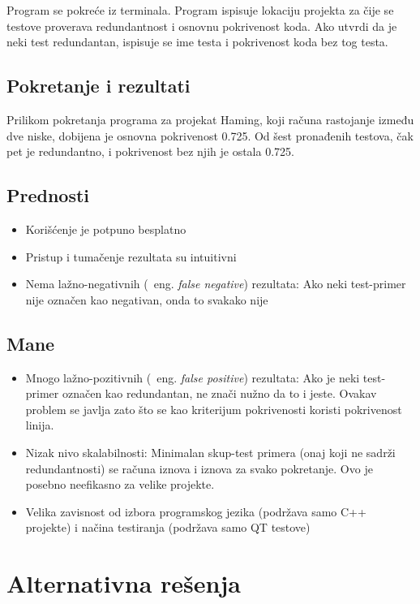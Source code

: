\documentclass[a4paper]{article}
\begin{document}
Program se pokreće iz terminala. Program ispisuje lokaciju projekta za čije se testove proverava redundantnost i osnovnu pokrivenost koda. Ako utvrdi da je neki test redundantan, ispisuje se ime testa i pokrivenost koda bez tog testa.

\subsection{Pokretanje i rezultati}
\label{subsec:pokretanje_rezultati}

Prilikom pokretanja programa za projekat Haming, koji računa rastojanje između dve niske, dobijena je osnovna pokrivenost 0.725. Od šest pronađenih testova, čak pet je redundantno, i pokrivenost bez njih je ostala 0.725.

\subsection{Prednosti}
\label{subsec:prednosti}
\begin{itemize}
    \item Korišćenje je potpuno besplatno
    \item Pristup i tumačenje rezultata su intuitivni
    \item Nema lažno-negativnih (~eng. \textit{false negative}) rezultata: Ako neki test-primer nije označen kao negativan, onda to svakako nije
\end{itemize}

\subsection{Mane}
\label{subsec:mane}
\begin{itemize}
    \item Mnogo lažno-pozitivnih (~eng. \textit{false positive}) rezultata: Ako je neki test-primer označen kao redundantan, ne znači nužno da to i jeste. Ovakav problem se javlja zato što se kao kriterijum pokrivenosti koristi pokrivenost linija.
    \item Nizak nivo skalabilnosti: Minimalan skup-test primera (onaj koji ne sadrži redundantnosti) se računa iznova i iznova za svako pokretanje. Ovo je posebno neefikasno za velike projekte.
    \item Velika zavisnost od izbora programskog jezika (podržava samo C++ projekte) i načina testiranja (podržava samo QT testove) 
\end{itemize}


\section{Alternativna rešenja}
\label{sec:alternative}
\end{document}
